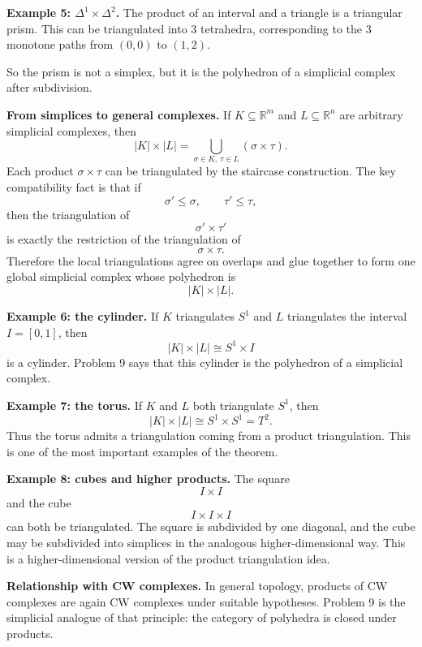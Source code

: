 \documentclass[12pt,a4paper]{article}
\theoremstyle{notespace}
\begin{document}
\medskip

\textbf{Example 5: \(\Delta^1\times \Delta^2\).}
The product of an interval and a triangle is a triangular prism. This can be triangulated into \(3\) tetrahedra, corresponding to the \(3\) monotone paths from \((0,0)\) to \((1,2)\).

So the prism is not a simplex, but it is the polyhedron of a simplicial complex after subdivision.

\medskip

\textbf{From simplices to general complexes.}
If \(K\subseteq \mathbb R^m\) and \(L\subseteq \mathbb R^n\) are arbitrary simplicial complexes, then
\[
|K|\times |L|
=
\bigcup_{\sigma\in K,\ \tau\in L} (\sigma\times\tau).
\]
Each product \(\sigma\times\tau\) can be triangulated by the staircase construction. The key compatibility fact is that if
\[
\sigma'\le \sigma,
\qquad
\tau'\le \tau,
\]
then the triangulation of
\[
\sigma'\times\tau'
\]
is exactly the restriction of the triangulation of
\[
\sigma\times\tau.
\]
Therefore the local triangulations agree on overlaps and glue together to form one global simplicial complex whose polyhedron is
\[
|K|\times |L|.
\]

\medskip

\textbf{Example 6: the cylinder.}
If \(K\) triangulates \(S^1\) and \(L\) triangulates the interval \(I=[0,1]\), then
\[
|K|\times |L|\cong S^1\times I
\]
is a cylinder. Problem 9 says that this cylinder is the polyhedron of a simplicial complex.

\medskip

\textbf{Example 7: the torus.}
If \(K\) and \(L\) both triangulate \(S^1\), then
\[
|K|\times |L|\cong S^1\times S^1=T^2.
\]
Thus the torus admits a triangulation coming from a product triangulation. This is one of the most important examples of the theorem.

\medskip

\textbf{Example 8: cubes and higher products.}
The square
\[
I\times I
\]
and the cube
\[
I\times I\times I
\]
can both be triangulated. The square is subdivided by one diagonal, and the cube may be subdivided into simplices in the analogous higher-dimensional way. This is a higher-dimensional version of the product triangulation idea.

\bigskip

\textbf{Relationship with CW complexes.}
In general topology, products of CW complexes are again CW complexes under suitable hypotheses. Problem 9 is the simplicial analogue of that principle: the category of polyhedra is closed under products.
\end{document}

